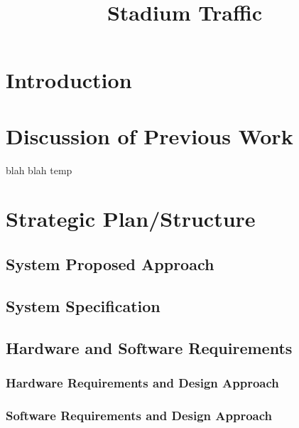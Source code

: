 \documentclass[12pt,titlepage]{article}
\title{Stadium Traffic}
\begin{document}
\maketitle
\frontmatter
\abstract

\newpage

\tableofcontents
\newpage

\mainmatter
\section{Introduction}


\section{Discussion of Previous Work}
\cite{murthy01}
blah blah \cite{kuppam11}
temp \cite{ite08}
\section{Strategic Plan/Structure}
\subsection{System Proposed Approach}
\subsection{System Specification}
\subsection{Hardware and Software Requirements}
\subsubsection{Hardware Requirements and Design Approach}
\subsubsection{ Software Requirements and Design Approach}

\end{document}
